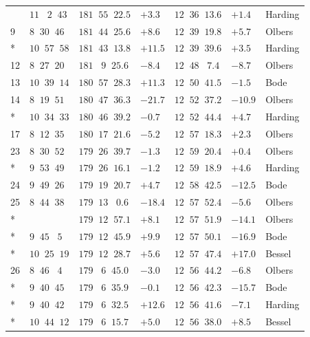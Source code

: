 \begin{longtable}{l|l|l|l|l|l|l}
        & $11\;\;\;2\;\;43$ & $181\;\;55\;\;22.5$ & $+3.3$ & $12\;\;36\;\;13.6$ & $+1.4$ & Harding \\
9       & $8\;\;30\;\;46$ & $181\;\;44\;\;25.6$ & $+8.6$ & $12\;\;39\;\;19.8$ & $+5.7$ & Olbers \\*
        & $10\;\;57\;\;58$ & $181\;\;43\;\;13.8$ & $+11.5$ & $12\;\;39\;\;39.6$ & $+3.5$ & Harding \\
12      & $8\;\;27\;\;20$ & $181\;\;\;9\;\;25.6$ & $-8.4$ & $12\;\;48\;\;\;7.4$ & $-8.7$ & Olbers \\
13      & $10\;\;39\;\;14$ & $180\;\;57\;\;28.3$ & $+11.3$ & $12\;\;50\;\;41.5$ & $-1.5$ & Bode \\
14      & $8\;\;19\;\;51$ & $180\;\;47\;\;36.3$ & $-21.7$ & $12\;\;52\;\;37.2$ & $-10.9$ & Olbers \\*
        & $10\;\;34\;\;33$ & $180\;\;46\;\;39.2$ & $-0.7$ & $12\;\;52\;\;44.4$ & $+4.7$ & Harding \\
17      & $8\;\;12\;\;35$ & $180\;\;17\;\;21.6$ & $-5.2$ & $12\;\;57\;\;18.3$ & $+2.3$ & Olbers \\
23      & $8\;\;30\;\;52$ & $179\;\;26\;\;39.7$ & $-1.3$ & $12\;\;59\;\;20.4$ & $+0.4$ & Olbers \\*
        & $9\;\;53\;\;49$ & $179\;\;26\;\;16.1$ & $-1.2$ & $12\;\;59\;\;18.9$ & $+4.6$ & Harding \\
24      & $9\;\;49\;\;26$ & $179\;\;19\;\;20.7$ & $+4.7$ & $12\;\;58\;\;42.5$ & $-12.5$ & Bode \\
25      & $8\;\;44\;\;38$ & $179\;\;13\;\;\;0.6$ & $-18.4$ & $12\;\;57\;\;52.4$ & $-5.6$ & Olbers \\*
        & & $179\;\;12\;\;57.1$ & $+8.1$ & $12\;\;57\;\;51.9$ & $-14.1$ & Olbers \\*
        & $9\;\;45\;\;\;5$ & $179\;\;12\;\;45.9$ & $+9.9$ & $12\;\;57\;\;50.1$ & $-16.9$ & Bode \\*
        & $10\;\;25\;\;19$ & $179\;\;12\;\;28.7$ & $+5.6$ & $12\;\;57\;\;47.4$ & $+17.0$ & Bessel \\
26      & $8\;\;46\;\;\;4$ & $179\;\;\;6\;\;45.0$ & $-3.0$ & $12\;\;56\;\;44.2$ & $-6.8$ & Olbers \\*
        & $9\;\;40\;\;45$ & $179\;\;\;6\;\;35.9$ & $-0.1$ & $12\;\;56\;\;42.3$ & $-15.7$ & Bode \\*
        & $9\;\;40\;\;42$ & $179\;\;\;6\;\;32.5$ & $+12.6$ & $12\;\;56\;\;41.6$ & $-7.1$ & Harding \\*
        & $10\;\;44\;\;12$ & $179\;\;\;6\;\;15.7$ & $+5.0$ & $12\;\;56\;\;38.0$ & $+8.5$ & Bessel \\

\end{longtable}
